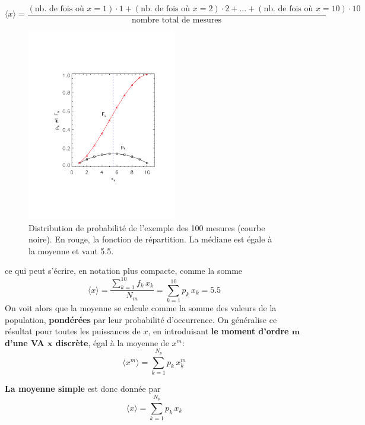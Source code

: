 \begin{equation*}
    \langle x\rangle=\frac{
        (\text{nb. de fois où $x\!=\!1$})\!\cdot\!1 +
        (\text{nb. de fois où $x\!=\!2$})\!\cdot\!2 + ... +
        (\text{nb. de fois où $x\!=\!10$})\!\cdot\!10}{\text{nombre total de mesures}}
\end{equation*}
\begin{figure}
    \centering
    \vspace{-4mm}
    \includegraphics[width=6.5cm]{assets/figures/probabiliteEtfonctiondeRepartition.pdf}
    \caption{Distribution de probabilité de l'exemple des 100 mesures (courbe noire). En rouge, la fonction de répartition. La médiane est égale à la moyenne et vaut 5.5.}
    \label{fig:edfdr}
\end{figure}

ce qui peut s'écrire, en notation plus compacte, comme la somme
\begin{equation}
    \langle x\rangle=\frac{\sum_{k=1}^{10}f_k\,x_k}{N_m}=\sum_{k=1}^{10}p_k\,x_k=5.5
\end{equation}
On voit alors que la moyenne se calcule comme la somme des valeurs de la population, \textbf{pondérées} par leur probabilité d'occurrence. On généralise ce résultat pour toutes les puissances de $x$, en introduisant \textbf{le moment d'ordre $\mathbf{m}$ d'une VA $\mathbf{x}$ discrète}, égal à la moyenne de $x^m$:
\begin{equation}
    \langle x^m\rangle=\sum_{k=1}^{N_p}p_k\,x_k^m
\end{equation}

\noindent\textbf{La moyenne simple} est donc donnée par
\begin{equation}
    \langle x\rangle=\sum_{k=1}^{N_p}p_k\,x_k
\end{equation}

